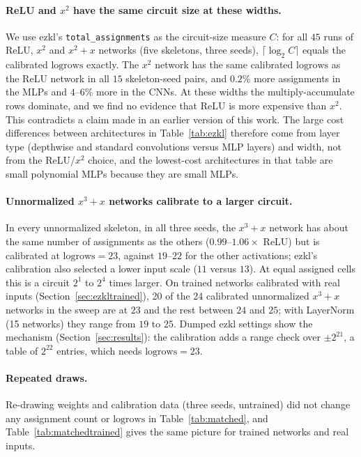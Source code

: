 \documentclass[10pt]{article}
\newcommand{\logrows}{\mathrm{logrows}}
\begin{document}
\paragraph{ReLU and $x^2$ have the same circuit size at these widths.}
We use ezkl's \texttt{total\_assignments} as the circuit-size measure $C$: for all $45$
runs of ReLU, $x^2$ and $x^2{+}x$ networks (five skeletons, three seeds),
$\lceil\log_2 C\rceil$ equals the calibrated $\logrows$ exactly.  The $x^2$ network has the same calibrated
$\logrows$ as the ReLU network in all $15$ skeleton-seed pairs, and $0.2\%$ more assignments in the MLPs and
$4$--$6\%$ more in the CNNs.  At these widths the
multiply-accumulate rows dominate, and we find no evidence that ReLU is more expensive than
$x^2$.  This contradicts a claim made in an earlier version of this work.  The large cost
differences between architectures in Table~\ref{tab:ezkl} therefore come from layer type
(depthwise and standard convolutions versus MLP layers) and width, not from the ReLU/$x^2$
choice, and the lowest-cost architectures in that table are small polynomial MLPs because
they are small MLPs.

\paragraph{Unnormalized $x^3{+}x$ networks calibrate to a larger circuit.}
In every unnormalized skeleton, in all three seeds, the $x^3{+}x$ network has about the same number of
assignments as the others ($0.99$--$1.06\times$ ReLU) but is calibrated at $\logrows{=}23$, against $19$--$22$ for the
other activations; ezkl's calibration also selected a lower input scale ($11$ versus $13$).  At equal assigned cells this is a circuit
$2^{1}$ to $2^{4}$ times larger.  On trained networks calibrated with real inputs (Section~\ref{sec:ezkltrained}), 20 of the 24 calibrated unnormalized
$x^3{+}x$ networks in the sweep are at $23$ and the rest between $24$ and $25$; with LayerNorm (15 networks) they range from $19$ to $25$.  Dumped ezkl settings
show the mechanism (Section~\ref{sec:results}): the calibration adds a range check over $\pm2^{21}$, a table of $2^{22}$ entries, which needs $\logrows=23$.

\paragraph{Repeated draws.}
Re-drawing weights and calibration data (three seeds, untrained) did not change any assignment count or $\logrows$ in Table~\ref{tab:matched}, and
Table~\ref{tab:matchedtrained} gives the same picture for trained networks and real inputs.
\end{document}
